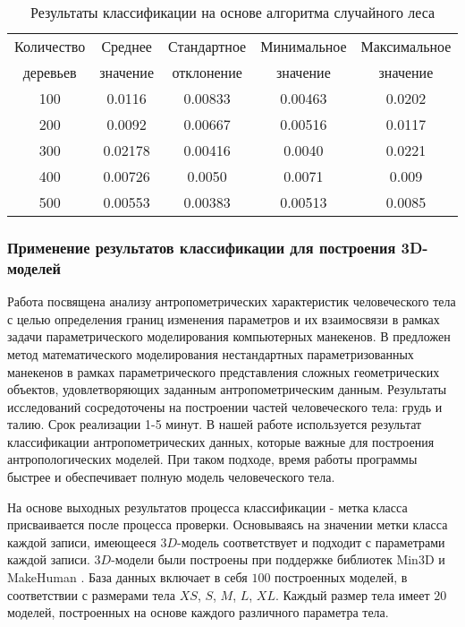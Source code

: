 \begin{table}[b!]%
\begin{center}
\caption{Результаты классификации на основе алгоритма случайного леса \cite{long1,long2}}\label{tab6}
  \begin{tabular}{|c|c|c|c|c|}
    \hline
  Количество  & Среднее   &   Стандартное   & Минимальное   & Максимальное \\
деревьев     & значение  &    отклонение   & значение      &значение      \\
\hline
100	&0.0116	&0.00833	&0.00463	&0.0202\\
\hline
200	&0.0092	&0.00667	&0.00516	&0.0117 \\
\hline
300	&0.02178	&0.00416	&0.0040	&0.0221\\
\hline
400	&0.00726	&0.0050	&0.0071	&0.009\\
\hline
500	&0.00553	&0.00383	&0.00513	&0.0085\\
\hline
  \end{tabular}
\end{center}
\end{table}%

\subsubsection{Применение результатов классификации для построения 3D-моделей}
Работа \cite{grudinin2009} посвящена анализу антропометрических характеристик человеческого тела с целью определения границ изменения параметров и их взаимосвязи в рамках задачи параметрического моделирования компьютерных манекенов. В \cite{grudinin2014} предложен метод математического моделирования нестандартных параметризованных манекенов в рамках параметрического представления сложных геометрических объектов, удовлетворяющих заданным антропометрическим данным. Результаты исследований сосредоточены на построении частей человеческого тела: грудь и талию. Срок реализации 1-5 минут. В нашей работе используется результат классификации антропометрических данных, которые важные для построения антропологических моделей. При таком подходе, время работы программы быстрее и обеспечивает полную модель человеческого тела.

На основе выходных результатов процесса классификации - метка класса присваивается после процесса проверки. Основываясь на значении метки класса каждой записи, имеющееся $3D$-модель соответствует и подходит с параметрами каждой записи. $3D$-модели были построены при поддержке библиотек Min3D \cite{Min3D} и MakeHuman \cite{Make}. База данных включает в себя $100$ построенных моделей, в соответствии с размерами тела $XS$, $S$, $M$, $L$, $XL$. Каждый размер тела имеет $20$ моделей, построенных на основе каждого различного параметра тела.

